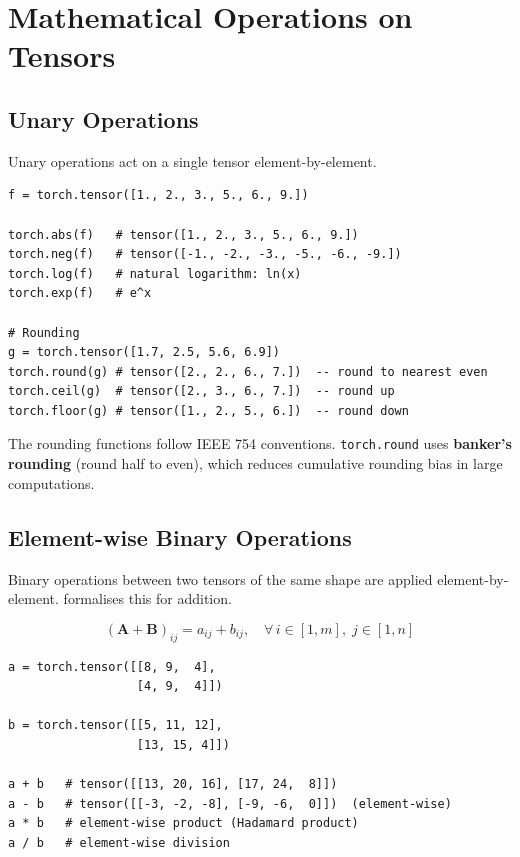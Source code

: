 \documentclass[12pt,a4paper]{article}
\newcommand{\tbf}[1]{\textbf{#1}}
\newcommand{\ttt}[1]{\texttt{#1}}
\begin{document}
\section{Mathematical Operations on Tensors}
\label{sec:math-ops}

\subsection{Unary Operations}
\label{subsec:unary}

Unary operations act on a single tensor element-by-element.

\begin{lstlisting}[caption={Unary mathematical operations (V11, 00:45:00).},
                   label={lst:unary}]
f = torch.tensor([1., 2., 3., 5., 6., 9.])

torch.abs(f)   # tensor([1., 2., 3., 5., 6., 9.])
torch.neg(f)   # tensor([-1., -2., -3., -5., -6., -9.])
torch.log(f)   # natural logarithm: ln(x)
torch.exp(f)   # e^x

# Rounding
g = torch.tensor([1.7, 2.5, 5.6, 6.9])
torch.round(g) # tensor([2., 2., 6., 7.])  -- round to nearest even
torch.ceil(g)  # tensor([2., 3., 6., 7.])  -- round up
torch.floor(g) # tensor([1., 2., 5., 6.])  -- round down
\end{lstlisting}

The rounding functions follow IEEE 754 conventions. \ttt{torch.round} uses
\tbf{banker's rounding} (round half to even), which reduces cumulative rounding
bias in large computations.

\subsection{Element-wise Binary Operations}
\label{subsec:binary}

Binary operations between two tensors of the same shape are applied
element-by-element.  formalises this for addition.

\begin{equation}
  \label{eq:elemwise}
  (\mathbf{A} + \mathbf{B})_{ij} = a_{ij} + b_{ij}, \quad
  \forall\, i \in [1, m],\; j \in [1, n]
\end{equation}

\begin{lstlisting}[caption={Element-wise arithmetic (V12, 00:53:45).},
                   label={lst:elemwise}]
a = torch.tensor([[8, 9,  4],
                  [4, 9,  4]])

b = torch.tensor([[5, 11, 12],
                  [13, 15, 4]])

a + b   # tensor([[13, 20, 16], [17, 24,  8]])
a - b   # tensor([[-3, -2, -8], [-9, -6,  0]])  (element-wise)
a * b   # element-wise product (Hadamard product)
a / b   # element-wise division
\end{lstlisting}
\end{document}
